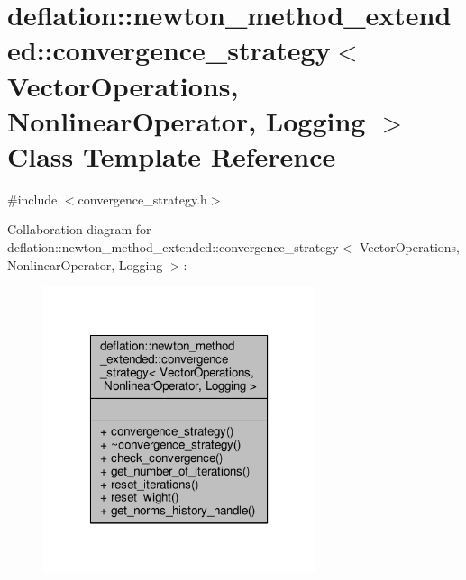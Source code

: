 \hypertarget{classdeflation_1_1newton__method__extended_1_1convergence__strategy}{\section{deflation\-:\-:newton\-\_\-method\-\_\-extended\-:\-:convergence\-\_\-strategy$<$ Vector\-Operations, Nonlinear\-Operator, Logging $>$ Class Template Reference}
\label{classdeflation_1_1newton__method__extended_1_1convergence__strategy}
}


{\ttfamily \#include $<$convergence\-\_\-strategy.\-h$>$}



Collaboration diagram for deflation\-:\-:newton\-\_\-method\-\_\-extended\-:\-:convergence\-\_\-strategy$<$ Vector\-Operations, Nonlinear\-Operator, Logging $>$\-:\nopagebreak
\begin{figure}[H]
\begin{center}
\leavevmode
\includegraphics[width=226pt]{classdeflation_1_1newton__method__extended_1_1convergence__strategy__coll__graph}
\end{center}
\end{figure}
